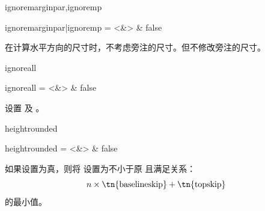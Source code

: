 \documentclass[twoside]{book}
\begin{document}
\begin{keyval}[path=layout]{ignoremarginpar,ignoremp}
  \begin{syntax}
    ignoremarginpar|ignoremp = <&\TTF> & false 
  \end{syntax}
在计算水平方向的尺寸时，不考虑旁注的尺寸。但不修改旁注的尺寸。
\end{keyval}

\begin{keyval}[path=layout]{ignoreall}
  \begin{syntax}
    ignoreall = <&\TTF> & false 
  \end{syntax}
设置  及 。
\end{keyval}

\begin{keyval}[path=layout]{heightrounded}
  \begin{syntax}
    heightrounded = <&\TTF> & false
  \end{syntax}
如果设置为真，则将  设置为不小于原  且满足关系：
\[ n\times{}\text{\tn{baselineskip}}{}+{}\text{\tn{topskip}}\] 
的最小值。
\end{keyval}
\end{document}
